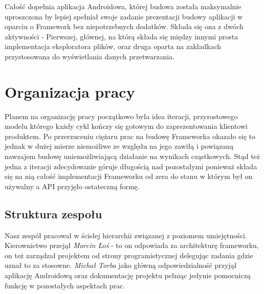 Całość dopełnia aplikacja Androidowa, której budowa została maksymalnie uproszczona by lepiej spełniał swoje zadanie prezentacji budowy aplikacji w oparciu o Framework bez niepotrzebnych dodatków. Składa się ona z dwóch aktywności - Pierwszej, głównej, na którą składa się między innymi prosta implementacja eksploratora plików, oraz druga oparta na zakładkach przystosowana do wyświetlania danych przetwarzania.

\chapter{Organizacja pracy}
Planem na organizację pracy początkowo była idea iteracji, przyrostowego modelu którego każdy cykl kończy się gotowym do zaprezentowania klientowi produktem. Po przerzuceniu ciężaru prac na budowę Frameworka okazało się to jednak w dużej mierze niemożliwe ze względu na jego zawiłą i powiązaną nawzajem budowę uniemożliwiającą działanie na wynikach cząstkowych. Stąd też jedna z iteracji zdecydowanie góruje długością nad pozostałymi ponieważ składa się na nią całość implementacji Frameworku od zera do stanu w którym był on używalny a API przyjęło ostateczną formę.

\section{Struktura zespołu}
Nasz zespół pracował w ścisłej hierarchii związanej z poziomem umiejętności. Kierownictwo przejął \emph{Marcin Łoś} - to on odpowiada za architekturę frameworku, on też zarządzał projektem od strony programistycznej delegując zadania gdzie uznał to za stosowne. \emph{Michał Torba} jako główną odpowiedzialność przyjął aplikację Androidową oraz dokumentację projektu pełniąc jedynie pomocniczą funkcję w pozostałych aspektach prac.
